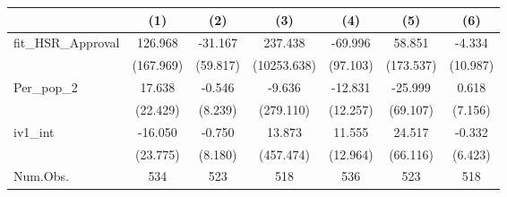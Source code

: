 \begin{longtable}{lcccccc}
\toprule
  & (1) & (2) & (3) & (4) & (5) & (6) \\ 
\midrule
fit\_HSR\_Approval & 126.968 & -31.167 & 237.438 & -69.996 & 58.851 & -4.334 \\ 
 & (167.969) & (59.817) & (10253.638) & (97.103) & (173.537) & (10.987) \\ 
Per\_pop\_2 & 17.638 & -0.546 & -9.636 & -12.831 & -25.999 & 0.618 \\ 
 & (22.429) & (8.239) & (279.110) & (12.257) & (69.107) & (7.156) \\ 
iv1\_int & -16.050 & -0.750 & 13.873 & 11.555 & 24.517 & -0.332 \\ 
 & (23.775) & (8.180) & (457.474) & (12.964) & (66.116) & (6.423) \\ 
Num.Obs. & 534 & 523 & 518 & 536 & 523 & 518 \\ 
\bottomrule
\end{longtable}

